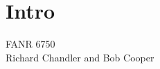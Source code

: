 \documentclass[color=usenames,dvipsnames]{beamer}\usepackage[]{graphicx}\usepackage[]{color}
\makeatletter
\newcommand{\hlnum}[1]{\textcolor[rgb]{0.69,0.494,0}{#1}}%
\newcommand{\hlstr}[1]{\textcolor[rgb]{0.749,0.012,0.012}{#1}}%
\newcommand{\hlcom}[1]{\textcolor[rgb]{0.514,0.506,0.514}{\textit{#1}}}%
\newcommand{\hlopt}[1]{\textcolor[rgb]{0,0,0}{#1}}%
\newcommand{\hlstd}[1]{\textcolor[rgb]{0,0,0}{#1}}%
\newcommand{\hlkwb}[1]{\textcolor[rgb]{0,0.341,0.682}{#1}}%
\newcommand{\hlkwc}[1]{\textcolor[rgb]{0,0,0}{\textbf{#1}}}%
\newcommand{\hlkwd}[1]{\textcolor[rgb]{0.004,0.004,0.506}{#1}}%
\newenvironment{kframe}{%
 \def\at@end@of@kframe{}%
 \ifinner\ifhmode%
  \def\at@end@of@kframe{\end{minipage}}%
  \begin{minipage}{\columnwidth}%
 \fi\fi%
 \def\FrameCommand##1{\hskip\@totalleftmargin \hskip-\fboxsep
 \colorbox{shadecolor}{##1}\hskip-\fboxsep
     \hskip-\linewidth \hskip-\@totalleftmargin \hskip\columnwidth}%
 \MakeFramed {\advance\hsize-\width
   \@totalleftmargin\z@ \linewidth\hsize
   \@setminipage}}%
 {\par\unskip\endMakeFramed%
 \at@end@of@kframe}
\newenvironment{knitrout}{}{} %
\makeatother
\begin{document}
\section{Intro}

\begin{frame}[plain]
  \LARGE
  \centering \par
  {\color{RoyalBlue}{\huge Lab 7 -- $A \times B$ Factorial Designs}} \par
  \vspace{1cm}
  \Large
  FANR 6750 \\
  \vfill
  \large
  Richard Chandler and Bob Cooper
\end{frame}



\begin{comment}
\begin{frame}[fragile]
  \frametitle{Data}
\begin{knitrout}
\definecolor{shadecolor}{rgb}{0.878, 0.918, 0.933}\color{fgcolor}\begin{kframe}
\begin{alltt}
\hlstd{makeData} \hlkwb{<-} \hlkwd{data.frame}\hlstd{(}\hlkwc{precip}\hlstd{=}\hlkwd{rep}\hlstd{(}\hlkwd{c}\hlstd{(}\hlstr{"Wet"}\hlstd{,} \hlstr{"Dry"}\hlstd{),} \hlkwc{each}\hlstd{=}\hlnum{24}\hlstd{),}
                       \hlkwc{temp}\hlstd{=}\hlkwd{rep}\hlstd{(}\hlkwd{c}\hlstd{(}\hlstr{"Cold"}\hlstd{,} \hlstr{"Hot"}\hlstd{),} \hlkwc{times}\hlstd{=}\hlnum{24}\hlstd{))}
\hlstd{X} \hlkwb{<-} \hlkwd{model.matrix}\hlstd{(}\hlopt{~}\hlstd{precip}\hlopt{*}\hlstd{temp, makeData)} \hlcom{#~forest*season, makeData)}
\hlstd{E} \hlkwb{<-} \hlstd{X} \hlopt{%*%} \hlkwd{c}\hlstd{(}\hlnum{20}\hlstd{,} \hlnum{3}\hlstd{,} \hlopt{-}\hlnum{3}\hlstd{,} \hlopt{-}\hlnum{10}\hlstd{)}
\hlkwd{set.seed}\hlstd{(}\hlnum{3440}\hlstd{)}
\hlstd{species} \hlkwb{<-} \hlkwd{round}\hlstd{(}\hlkwd{rnorm}\hlstd{(}\hlkwd{nrow}\hlstd{(X), E,} \hlkwc{sd}\hlstd{=}\hlnum{2}\hlstd{))}
\hlstd{species}
\end{alltt}
\begin{verbatim}
##  [1] 27  9 23 10 21 12 28  8 23 11 20 10 24 12 21 12 26  8 22 10 21 11 25
## [24]  9 17 18 25 15 15 16 21 22 21 17 20 17 19 18 21 17 19 20 21 18 19 15
## [47] 21 17
\end{verbatim}
\begin{alltt}
\hlstd{richness} \hlkwb{<-} \hlkwd{data.frame}\hlstd{(species, makeData)}
\hlkwd{summary}\hlstd{(}\hlkwd{aov}\hlstd{(species} \hlopt{~} \hlstd{precip}\hlopt{*}\hlstd{temp, richness))}

\end{comment}
\end{document}
